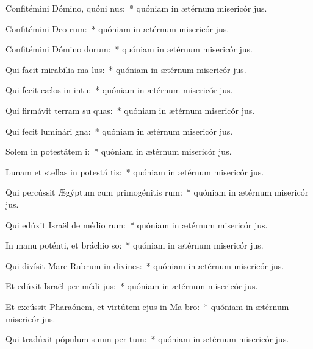 \item Confitémini Dómino, quóni nus:~* quóniam in ætérnum misericór jus.
\item Confitémini Deo rum:~* quóniam in ætérnum misericór jus.
\item Confitémini Dómino dorum:~* quóniam in ætérnum misericór jus.
\item Qui facit mirabília ma lus:~* quóniam in ætérnum misericór jus.
\item Qui fecit cælos in intu:~* quóniam in ætérnum misericór jus.
\item Qui firmávit terram su quas:~* quóniam in ætérnum misericór jus.
\item Qui fecit luminári gna:~* quóniam in ætérnum misericór jus.
\item Solem in potestátem i:~* quóniam in ætérnum misericór jus.
\item Lunam et stellas in potestá tis:~* quóniam in ætérnum misericór jus.
\item Qui percússit Ægýptum cum primogénitis rum:~* quóniam in ætérnum misericór jus.
\item Qui edúxit Israël de médio rum:~* quóniam in ætérnum misericór jus.
\item In manu poténti, et bráchio so:~* quóniam in ætérnum misericór jus.
\item Qui divísit Mare Rubrum in divines:~* quóniam in ætérnum misericór jus.
\item Et edúxit Israël per médi jus:~* quóniam in ætérnum misericór jus.
\item Et excússit Pharaónem, et virtútem ejus in Ma bro:~* quóniam in ætérnum misericór jus.
\item Qui tradúxit pópulum suum per tum:~* quóniam in ætérnum misericór jus.
